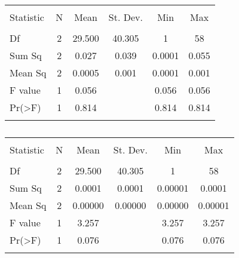 \begin{table}[!htbp] \centering 
  \caption{} 
  \label{} 
\begin{tabular}{@{\extracolsep{5pt}}lccccc} 
\\[-1.8ex]\hline 
\hline \\[-1.8ex] 
Statistic & \multicolumn{1}{c}{N} & \multicolumn{1}{c}{Mean} & \multicolumn{1}{c}{St. Dev.} & \multicolumn{1}{c}{Min} & \multicolumn{1}{c}{Max} \\ 
\hline \\[-1.8ex] 
Df & 2 & 29.500 & 40.305 & 1 & 58 \\ 
Sum Sq & 2 & 0.027 & 0.039 & 0.0001 & 0.055 \\ 
Mean Sq & 2 & 0.0005 & 0.001 & 0.0001 & 0.001 \\ 
F value & 1 & 0.056 &  & 0.056 & 0.056 \\ 
Pr(\textgreater F) & 1 & 0.814 &  & 0.814 & 0.814 \\ 
\hline \\[-1.8ex] 
\end{tabular} 
\end{table} 

\begin{table}[!htbp] \centering 
  \caption{} 
  \label{} 
\begin{tabular}{@{\extracolsep{5pt}}lccccc} 
\\[-1.8ex]\hline 
\hline \\[-1.8ex] 
Statistic & \multicolumn{1}{c}{N} & \multicolumn{1}{c}{Mean} & \multicolumn{1}{c}{St. Dev.} & \multicolumn{1}{c}{Min} & \multicolumn{1}{c}{Max} \\ 
\hline \\[-1.8ex] 
Df & 2 & 29.500 & 40.305 & 1 & 58 \\ 
Sum Sq & 2 & 0.0001 & 0.0001 & 0.00001 & 0.0001 \\ 
Mean Sq & 2 & 0.00000 & 0.00000 & 0.00000 & 0.00001 \\ 
F value & 1 & 3.257 &  & 3.257 & 3.257 \\ 
Pr(\textgreater F) & 1 & 0.076 &  & 0.076 & 0.076 \\ 
\hline \\[-1.8ex] 
\end{tabular} 
\end{table} 

